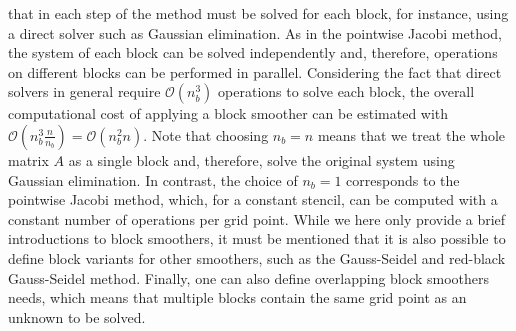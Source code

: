 that in each step of the method must be solved for each block, for instance, using a direct solver such as Gaussian elimination.
As in the pointwise Jacobi method, the system of each block can be solved independently and, therefore, operations on different blocks can be performed in parallel. 
Considering the fact that direct solvers in general require $\mathcal{O}(n_b^3)$ operations to solve each block, the overall computational cost of applying a block smoother can be estimated with $\mathcal{O}(n_b^3 \frac{n}{n_b}) = \mathcal{O}(n_b^2 n)$.
Note that choosing $n_b = n$ means that we treat the whole matrix $A$ as a single block and, therefore, solve the original system using Gaussian elimination.
In contrast, the choice of $n_b = 1$ corresponds to the pointwise Jacobi method, which, for a constant stencil, can be computed with a constant number of operations per grid point.
While we here only provide a brief introductions to block smoothers, it must be mentioned that it is also possible to define block variants for other smoothers, such as the Gauss-Seidel and red-black Gauss-Seidel method.
Finally, one can also define overlapping block smoothers needs, which means that multiple blocks contain the same grid point as an unknown to be solved.

